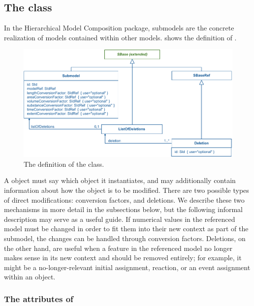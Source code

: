 \subsection{The  class}
\label{submodel-class}
\label{listofdeletions-class}

In the Hierarchical Model Composition package, submodels are the
concrete realization of models contained within other models.
 shows the definition of \Submodel.

\begin{figure}[hbt]
  \includegraphics{figs/submodel-uml}
  \caption{The definition of the \Submodel class.}
  \label{submodel-uml}
\end{figure}

A \Submodel object must say which \Model object it instantiates, and may
additionally contain information about how the \Model object is to be
modified.  There are two possible types of direct modifications:
conversion factors, and deletions.  We describe these two mechanisms in
more detail in the subsections below, but the following informal
description may serve as a useful guide.  If numerical values in the
referenced model must be changed in order to fit them into their new
context as part of the submodel, the changes can be handled through
conversion factors.  Deletions, on the other hand, are useful when a
feature in the referenced model no longer makes sense in its new context
and should be removed entirely; for example, it might be a
no-longer-relevant initial assignment, reaction, or an event assignment
within an \Event object.


\subsubsection{The attributes of }

